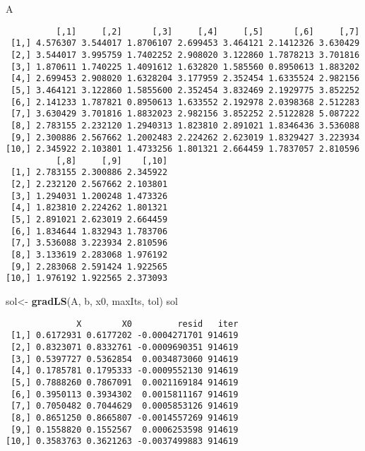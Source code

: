 \documentclass[]{article}
\newenvironment{Shaded}{\begin{snugshade}}{\end{snugshade}}
\newcommand{\KeywordTok}[1]{\textcolor[rgb]{0.13,0.29,0.53}{\textbf{#1}}}
\newcommand{\StringTok}[1]{\textcolor[rgb]{0.31,0.60,0.02}{#1}}
\newcommand{\NormalTok}[1]{#1}
\begin{document}
\begin{Shaded}
\begin{Highlighting}[]
\NormalTok{A}
\end{Highlighting}
\end{Shaded}

\begin{verbatim}
          [,1]     [,2]      [,3]     [,4]     [,5]      [,6]     [,7]
 [1,] 4.576307 3.544017 1.8706107 2.699453 3.464121 2.1412326 3.630429
 [2,] 3.544017 3.995759 1.7402252 2.908020 3.122860 1.7878213 3.701816
 [3,] 1.870611 1.740225 1.4091612 1.632820 1.585560 0.8950613 1.883202
 [4,] 2.699453 2.908020 1.6328204 3.177959 2.352454 1.6335524 2.982156
 [5,] 3.464121 3.122860 1.5855600 2.352454 3.832469 2.1929775 3.852252
 [6,] 2.141233 1.787821 0.8950613 1.633552 2.192978 2.0398368 2.512283
 [7,] 3.630429 3.701816 1.8832023 2.982156 3.852252 2.5122828 5.087222
 [8,] 2.783155 2.232120 1.2940313 1.823810 2.891021 1.8346436 3.536088
 [9,] 2.300886 2.567662 1.2002483 2.224262 2.623019 1.8329427 3.223934
[10,] 2.345922 2.103801 1.4733256 1.801321 2.664459 1.7837057 2.810596
          [,8]     [,9]    [,10]
 [1,] 2.783155 2.300886 2.345922
 [2,] 2.232120 2.567662 2.103801
 [3,] 1.294031 1.200248 1.473326
 [4,] 1.823810 2.224262 1.801321
 [5,] 2.891021 2.623019 2.664459
 [6,] 1.834644 1.832943 1.783706
 [7,] 3.536088 3.223934 2.810596
 [8,] 3.133619 2.283068 1.976192
 [9,] 2.283068 2.591424 1.922565
[10,] 1.976192 1.922565 2.373093
\end{verbatim}

\begin{Shaded}
\begin{Highlighting}[]
\NormalTok{sol<-}\StringTok{ }\KeywordTok{gradLS}\NormalTok{(A, b, x0, maxIts, tol)}
\NormalTok{sol}
\end{Highlighting}
\end{Shaded}

\begin{verbatim}
              X        X0         resid   iter
 [1,] 0.6172931 0.6177202 -0.0004271701 914619
 [2,] 0.8323071 0.8332761 -0.0009690351 914619
 [3,] 0.5397727 0.5362854  0.0034873060 914619
 [4,] 0.1785781 0.1795333 -0.0009552130 914619
 [5,] 0.7888260 0.7867091  0.0021169184 914619
 [6,] 0.3950113 0.3934302  0.0015811167 914619
 [7,] 0.7050482 0.7044629  0.0005853126 914619
 [8,] 0.8651250 0.8665807 -0.0014557269 914619
 [9,] 0.1558820 0.1552567  0.0006253598 914619
[10,] 0.3583763 0.3621263 -0.0037499883 914619
\end{verbatim}
\end{document}
